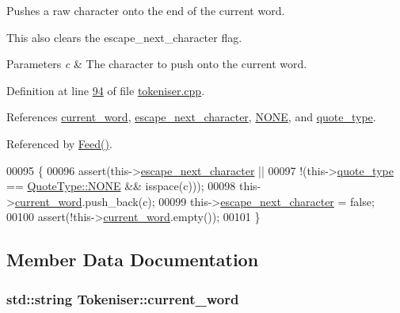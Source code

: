 Pushes a raw character onto the end of the current word. 

This also clears the escape\+\_\+next\+\_\+character flag.


\begin{DoxyParams}{Parameters}
{\em c} & The character to push onto the current word. \\
\hline
\end{DoxyParams}


Definition at line \hyperlink{tokeniser_8cpp_source_l00094}{94} of file \hyperlink{tokeniser_8cpp_source}{tokeniser.\+cpp}.



References \hyperlink{tokeniser_8hpp_source_l00070}{current\+\_\+word}, \hyperlink{tokeniser_8hpp_source_l00060}{escape\+\_\+next\+\_\+character}, \hyperlink{classTokeniser_a71d622e60fae9d6c36c96ba69a4f62e4ab50339a10e1de285ac99d4c3990b8693}{N\+O\+N\+E}, and \hyperlink{tokeniser_8hpp_source_l00063}{quote\+\_\+type}.



Referenced by \hyperlink{tokeniser_8cpp_source_l00026}{Feed()}.


\begin{DoxyCode}
00095 \{
00096     assert(this->\hyperlink{classTokeniser_ace181afc0f1425b87126becc79458edd}{escape\_next\_character} ||
00097            !(this->\hyperlink{classTokeniser_a10b7147e055edd438fcb951fc41faf65}{quote\_type} == \hyperlink{classTokeniser_a71d622e60fae9d6c36c96ba69a4f62e4ab50339a10e1de285ac99d4c3990b8693}{QuoteType::NONE} && isspace(c)));
00098     this->\hyperlink{classTokeniser_a5d703e64476ccc8cbf42cc7c3ef8bc79}{current\_word}.push\_back(c);
00099     this->\hyperlink{classTokeniser_ace181afc0f1425b87126becc79458edd}{escape\_next\_character} = \textcolor{keyword}{false};
00100     assert(!this->\hyperlink{classTokeniser_a5d703e64476ccc8cbf42cc7c3ef8bc79}{current\_word}.empty());
00101 \}
\end{DoxyCode}


\subsection{Member Data Documentation}
\hypertarget{classTokeniser_a5d703e64476ccc8cbf42cc7c3ef8bc79}{
\subsubsection[{current\+\_\+word}]{\setlength{\rightskip}{0pt plus 5cm}std\+::string Tokeniser\+::current\+\_\+word\hspace{0.3cm}{\ttfamily [private]}}}\label{classTokeniser_a5d703e64476ccc8cbf42cc7c3ef8bc79}


